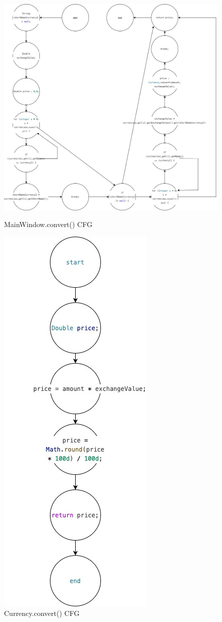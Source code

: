 \documentclass[11pt]{article}
\begin{document}
\begin{figure}[h]
    \centering
    \begin{minipage}{0.6\textwidth}
        \centering
        \includegraphics[width=0.9\linewidth]{MainWindow.convert()-no code.jpg}
        \caption{MainWindow.convert() CFG}
    \end{minipage}\hfill
    \begin{minipage}{0.4\textwidth}
        \centering
        \includegraphics[width=0.4\linewidth, angle=90]{Currency.convert()-no code.jpg}
        \caption{Currency.convert() CFG}
    \end{minipage}
\end{figure}
\end{document}
